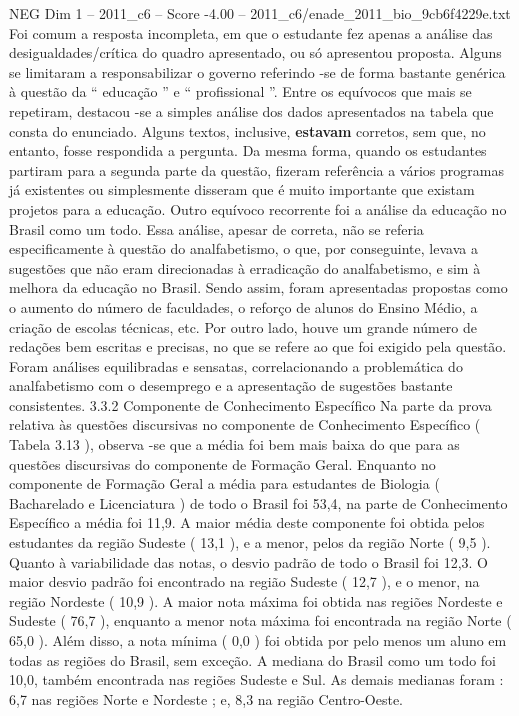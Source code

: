 \begin{textsample}{NEG Dim 1 – 2011\_c6 – Score -4.00 – 2011\_c6/enade\_2011\_bio\_9cb6f4229e.txt}
Foi comum a resposta incompleta, em que o estudante fez apenas a análise das desigualdades/crítica do quadro apresentado, ou só apresentou proposta.
Alguns se limitaram a responsabilizar o governo referindo -se de forma bastante genérica à questão da “ educação ” e “ profissional ”.
Entre os equívocos que mais se repetiram, destacou -se a simples análise dos dados apresentados na tabela que consta do enunciado.
Alguns textos, inclusive, \textbf{estavam} corretos, sem que, no entanto, fosse respondida a pergunta.
Da mesma forma, quando os estudantes partiram para a segunda parte da questão, fizeram referência a vários programas já existentes ou simplesmente disseram que é muito importante que existam projetos para a educação.
Outro equívoco recorrente foi a análise da educação no Brasil como um todo.
Essa análise, apesar de correta, não se referia especificamente à questão do analfabetismo, o que, por conseguinte, levava a sugestões que não eram direcionadas à erradicação do analfabetismo, e sim à melhora da educação no Brasil.
Sendo assim, foram apresentadas propostas como o aumento do número de faculdades, o reforço de alunos do Ensino Médio, a criação de escolas técnicas, etc.
Por outro lado, houve um grande número de redações bem escritas e precisas, no que se refere ao que foi exigido pela questão.
Foram análises equilibradas e sensatas, correlacionando a problemática do analfabetismo com o desemprego e a apresentação de sugestões bastante consistentes. 3.3.2 Componente de Conhecimento Específico Na parte da prova relativa às questões discursivas no componente de Conhecimento Específico ( Tabela 3.13 ), observa -se que a média foi bem mais baixa do que para as questões discursivas do componente de Formação Geral.
Enquanto no componente de Formação Geral a média para estudantes de Biologia ( Bacharelado e Licenciatura ) de todo o Brasil foi 53,4, na parte de Conhecimento Específico a média foi 11,9.
A maior média deste componente foi obtida pelos estudantes da região Sudeste ( 13,1 ), e a menor, pelos da região Norte ( 9,5 ).
Quanto à variabilidade das notas, o desvio padrão de todo o Brasil foi 12,3.
O maior desvio padrão foi encontrado na região Sudeste ( 12,7 ), e o menor, na região Nordeste ( 10,9 ).
A maior nota máxima foi obtida nas regiões Nordeste e Sudeste ( 76,7 ), enquanto a menor nota máxima foi encontrada na região Norte ( 65,0 ).
Além disso, a nota mínima ( 0,0 ) foi obtida por pelo menos um aluno em todas as regiões do Brasil, sem exceção.
A mediana do Brasil como um todo foi 10,0, também encontrada nas regiões Sudeste e Sul.
As demais medianas foram : 6,7 nas regiões Norte e Nordeste ; e, 8,3 na região Centro-Oeste.

\end{textsample}
